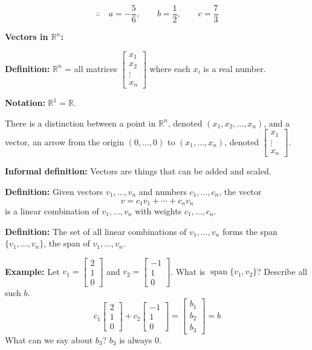 \documentclass{article}
\begin{document}
\[
\therefore \quad a = -\frac{5}{6}, \qquad b = \frac{1}{2}, \qquad c = \frac{7}{3}
\]

\newpage

\textbf{Vectors in $\mathbb{R}^n$:}

\medskip

\textbf{Definition:} $\mathbb{R}^n$ = all matrices $\begin{bmatrix} x_1 \\ x_2 \\ \vdots \\ x_n \end{bmatrix}$ where each $x_i$ is a real number.

\medskip

\textbf{Notation:} $\mathbb{R}^1 = \mathbb{R}$.

\medskip

There is a distinction between a point in $\mathbb{R}^n$, denoted $(x_1, x_2, \ldots, x_n)$, and a vector, an arrow from the origin $(0, \ldots, 0)$ to $(x_1, \ldots, x_n)$, denoted $\begin{bmatrix} x_1 \\ \vdots \\ x_n \end{bmatrix}$.

\medskip

\textbf{Informal definition:} Vectors are things that can be added and scaled.

\bigskip

\textbf{Definition:} Given vectors $v_1, \ldots, v_n$ and numbers $c_1, \ldots, c_n$, the vector
\[
v = c_1 v_1 + \cdots + c_n v_n
\]
is a linear combination of $v_1, \ldots, v_n$ with weights $c_1, \ldots, c_n$.

\medskip

\textbf{Definition:} The set of all linear combinations of $v_1, \ldots, v_n$ forms the span $\{v_1, \ldots, v_n\}$, the span of $v_1, \ldots, v_n$.

\medskip

\textbf{Example:} Let $v_1 = \begin{bmatrix} 2 \\ 1 \\ 0 \end{bmatrix}$ and $v_2 = \begin{bmatrix} -1 \\ 1 \\ 0 \end{bmatrix}$. What is $\operatorname{span}\{v_1, v_2\}$? Describe all such $b$.
\[
c_1 \begin{bmatrix} 2 \\ 1 \\ 0 \end{bmatrix} + c_2 \begin{bmatrix} -1 \\ 1 \\ 0 \end{bmatrix} = \begin{bmatrix} b_1 \\ b_2 \\ b_3 \end{bmatrix} = b
\]
What can we say about $b_3$? $b_3$ is always $0$.
\end{document}
